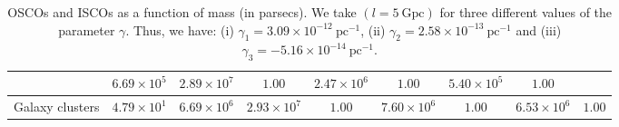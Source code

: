 \documentclass[aps,amsmath,amssymb,twocolumn]{revtex4}
\begin{document}
\begin{table*}[ht!]
\begin{tabular}{| c | c | c | c | c | c | c | c | c |}
   & $6.69 \times 10^{5}$
   & $2.89 \times 10^{7}$ & $1.00$ 
   & $2.47 \times 10^{6}$  &  $1.00$
   & $5.40 \times 10^{5}$  & $1.00$
    \\
   \hline
    Galaxy clusters & $ 4.79 \times 10^{1}$ 
   & $6.69 \times 10^{6}$
   & $2.93 \times 10^{7}$ & $1.00$ 
   & $7.60 \times 10^{6}$  &  $1.00$
   & $6.53 \times 10^{6}$  & $1.00$
     \\
   \hline
\end{tabular}
\caption{
OSCOs and ISCOs as a function of mass (in parsecs). We take $(l= 5 \ \text{Gpc})$ for three different values of the parameter $\gamma$. Thus, we have: 
(i) $\gamma_1 = 3.09 \times 10^{-12} \ \text{pc}^{-1}$,
(ii) $\gamma_2 = 2.58 \times 10^{-13} \ \text{pc}^{-1}$ 
and
(iii) $\gamma_3 = -5.16 \times 10^{-14} \ \text{pc}^{-1}$.
\label{numerical_table}
}
\end{table*}


\end{document}
